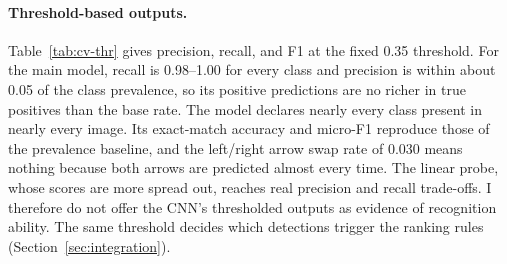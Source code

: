 \documentclass[11pt]{article}
\begin{document}
\paragraph{Threshold-based outputs.} Table~\ref{tab:cv-thr} gives precision, recall, and F1 at the fixed 0.35 threshold. For the main model, recall is 0.98--1.00 for every class and precision is within about 0.05 of the class prevalence, so its positive predictions are no richer in true positives than the base rate. The model declares nearly every class present in nearly every image. Its exact-match accuracy and micro-F1 reproduce those of the prevalence baseline, and the left/right arrow swap rate of 0.030 means nothing because both arrows are predicted almost every time. The linear probe, whose scores are more spread out, reaches real precision and recall trade-offs. I therefore do not offer the CNN's thresholded outputs as evidence of recognition ability. The same threshold decides which detections trigger the ranking rules (Section~\ref{sec:integration}).

\begin{table}[htbp]
\centering\small
\caption{Precision / recall / F1 at threshold 0.35 (pooled out-of-fold predictions, mean over repeats).}
\label{tab:cv-thr}
\end{table}
\end{document}

